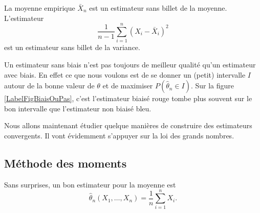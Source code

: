\begin{example}
    La moyenne empirique \( \bar X_n\) est un estimateur sans billet de la moyenne. L'estimateur
    \begin{equation}
        \frac{1}{ n-1 }\sum_{i=1}^n(X_i-\bar X_i)^2
    \end{equation}
    est un estimateur sans billet de la variance.
\end{example}

Un estimateur sans biais n'est pas toujours de meilleur qualité qu'un estimateur avec biais. En effet ce que nous voulons est de se donner un (petit) intervalle  \( I\) autour de la bonne valeur de \( \theta\) et de maximiser \( P(\hat\theta_n\in I)\). Sur la figure \ref{LabelFigBiaisOuPas}, c'est l'estimateur biaisé rouge tombe plus souvent sur le bon intervalle que l'estimateur non biaisé bleu.
\newcommand{\CaptionFigBiaisOuPas}{Un estimateur sans biais et un avec biais.}


Nous allons maintenant étudier quelque manières de construire des estimateurs convergents. Il vont évidemment s'appuyer sur la loi des grands nombres.

\subsection{Méthode des moments}

Sans surprises, un bon estimateur pour la moyenne est
\begin{equation}
    \hat\theta_n(X_1,\ldots,X_n)=\frac{1}{ n }\sum_{i=1}^nX_i.
\end{equation}

